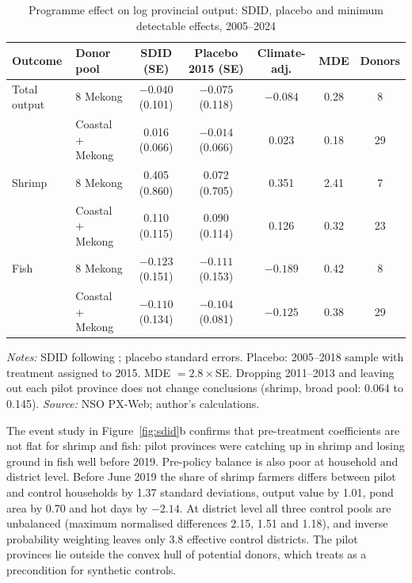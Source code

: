 \documentclass[11pt,a4paper]{article}
\begin{document}
\begin{table}[htbp]
\centering\footnotesize
\setlength{\tabcolsep}{4pt}
\caption{Programme effect on log provincial output: SDID, placebo and minimum detectable effects, 2005--2024}
\label{tab:did}
\begin{tabular}{@{}llccccc@{}}
\toprule
Outcome & Donor pool & SDID (SE) & Placebo 2015 (SE) & Climate-adj. & MDE & Donors \\
\midrule
Total output & 8 Mekong & $-0.040$ (0.101) & $-0.075$ (0.118) & $-0.084$ & 0.28 & 8 \\
 & Coastal + Mekong & 0.016 (0.066) & $-0.014$ (0.066) & 0.023 & 0.18 & 29 \\
Shrimp & 8 Mekong & 0.405 (0.860) & 0.072 (0.705) & 0.351 & 2.41 & 7 \\
 & Coastal + Mekong & 0.110 (0.115) & 0.090 (0.114) & 0.126 & 0.32 & 23 \\
Fish & 8 Mekong & $-0.123$ (0.151) & $-0.111$ (0.153) & $-0.189$ & 0.42 & 8 \\
 & Coastal + Mekong & $-0.110$ (0.134) & $-0.104$ (0.081) & $-0.125$ & 0.38 & 29 \\
\bottomrule
\end{tabular}
\begin{minipage}{\textwidth}\footnotesize
\textit{Notes:} SDID following \textcite{arkhangelsky2021}; placebo standard errors. Placebo: 2005--2018 sample with treatment assigned to 2015. MDE $=2.8\times$SE. Dropping 2011--2013 and leaving out each pilot province does not change conclusions (shrimp, broad pool: 0.064 to 0.145). \textit{Source:} NSO PX-Web; author's calculations.
\end{minipage}
\end{table}

The event study in Figure~\ref{fig:sdid}b confirms that pre-treatment coefficients are not flat for shrimp and fish: pilot provinces were catching up in shrimp and losing ground in fish well before 2019. Pre-policy balance is also poor at household and district level. Before June 2019 the share of shrimp farmers differs between pilot and control households by 1.37 standard deviations, output value by 1.01, pond area by 0.70 and hot days by $-2.14$. At district level all three control pools are unbalanced (maximum normalised differences 2.15, 1.51 and 1.18), and inverse probability weighting leaves only 3.8 effective control districts. The pilot provinces lie outside the convex hull of potential donors, which \textcite{abadie2021} treats as a precondition for synthetic controls.
\end{document}
